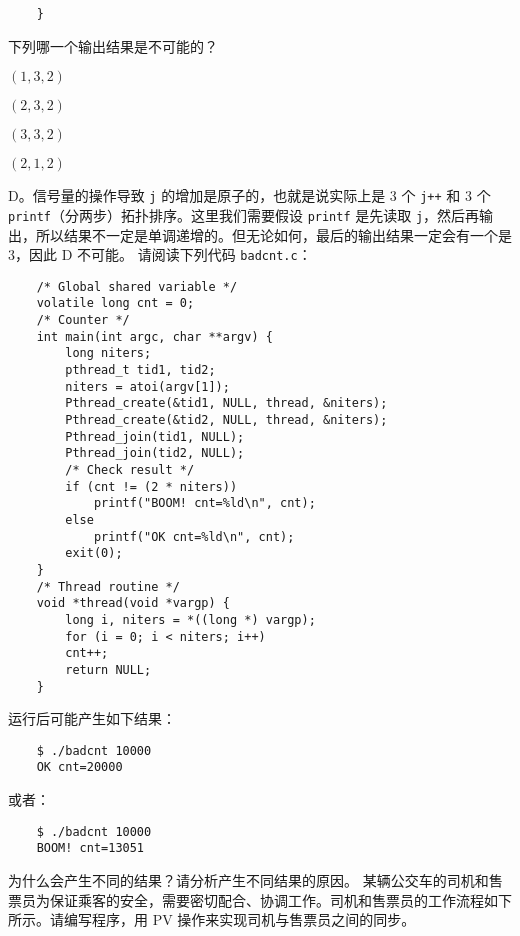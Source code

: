 \begin{problems}
\begin{verbatim}
    }
        \end{verbatim}
        下列哪一个输出结果是不可能的？
        \begin{choices}
            \item $(1, 3, 2)$
            \item $(2, 3, 2)$
            \item $(3, 3, 2)$
            \item $(2, 1, 2)$
        \end{choices}
        \sol D。信号量的操作导致 \verb|j| 的增加是原子的，也就是说实际上是 3 个 \verb|j++| 和 3 个 \verb|printf|（分两步）拓扑排序。这里我们需要假设 \verb|printf| 是先读取 \verb|j|，然后再输出，所以结果不一定是单调递增的。但无论如何，最后的输出结果一定会有一个是 3，因此 D 不可能。
         请阅读下列代码 \verb|badcnt.c|：
        \begin{verbatim}
    /* Global shared variable */
    volatile long cnt = 0;
    /* Counter */
    int main(int argc, char **argv) {
        long niters;
        pthread_t tid1, tid2;
        niters = atoi(argv[1]);
        Pthread_create(&tid1, NULL, thread, &niters);
        Pthread_create(&tid2, NULL, thread, &niters);
        Pthread_join(tid1, NULL);
        Pthread_join(tid2, NULL);
        /* Check result */
        if (cnt != (2 * niters))
            printf("BOOM! cnt=%ld\n", cnt);
        else
            printf("OK cnt=%ld\n", cnt);
        exit(0);
    }
    /* Thread routine */
    void *thread(void *vargp) {
        long i, niters = *((long *) vargp);
        for (i = 0; i < niters; i++)
        cnt++;
        return NULL;
    }
        \end{verbatim}
        运行后可能产生如下结果：
        \begin{verbatim}
    $ ./badcnt 10000
    OK cnt=20000
        \end{verbatim}
        或者：
        \begin{verbatim}
    $ ./badcnt 10000
    BOOM! cnt=13051
        \end{verbatim}
        为什么会产生不同的结果？请分析产生不同结果的原因。
         某辆公交车的司机和售票员为保证乘客的安全，需要密切配合、协调工作。司机和售票员的工作流程如下所示。请编写程序，用 PV 操作来实现司机与售票员之间的同步。
        \begin{table}[H]
            \centering
            \begin{tabular}{|c|c|}

\end{tabular}
\end{table}
\end{problems}
